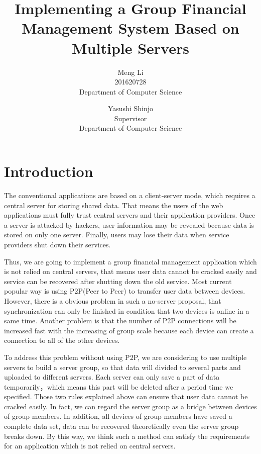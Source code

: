 \documentclass[twocolumn,10pt]{article}
\begin{document}
\date{}

\title{\bf Implementing a Group Financial Management System Based on Multiple Servers}

\author{
Meng Li\\
201620728\\
Department of Computer Science
\and
Yasushi Shinjo\\
Supervisor\\
Department of Computer Science
}

\maketitle

\section{Introduction}
The conventional applications are based on a client-server mode, which requires a central server for storing shared data. That means the users of the web applications must fully trust central servers and their application providers. Once a server is attacked by hackers, user information may be revealed because data is stored on only one server. Finally, users may lose their data when service providers shut down their services.

Thus, we are going to implement a group financial management application which is not relied on central servers, that means user data cannot be cracked easily and service can be recovered after shutting down the old service. Most current popular way is using P2P(Peer to Peer) to transfer user data between devices. However, there is a obvious problem in such a no-server proposal, that synchronization can only be finished in condition that two devices is online in a same time. Another problem is that the number of P2P connections will be increased fast with the increasing of group scale because each device can create a connection to all of the other devices. 

To address this problem without using P2P, we are considering to use multiple servers to build a server group, so that data will divided to several parts and uploaded to different servers. Each server can only save a part of data temporarily，which means this part will be deleted after a period time we specified. Those two rules explained above can ensure that user data cannot be cracked easily. In fact, we can regard the server group as a bridge between devices of group members. In addition, all devices of group members have saved a complete data set, data can be recovered theoretically even the server group breaks down. By this way, we think such a method can satisfy the requirements for an application which is not relied on central servers.
\end{document}
